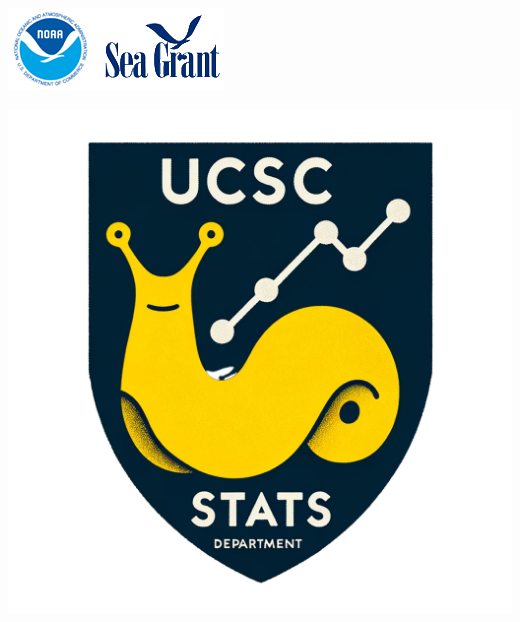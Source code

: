 \documentclass[ xcolor = pdftex, dvipsnames, table ]{beamer}
\begin{document}
\begin{frame}
{%
\begin{minipage}[h!]{0.69\textwidth}
\includegraphics[width=\textwidth]{seaGrant-logo.png}
\end{minipage}
\begin{minipage}[h!]{0.29\textwidth}
\includegraphics[width=\textwidth]{slugArms_blank background.png}
\end{minipage}
}
\end{frame}
\end{document}
